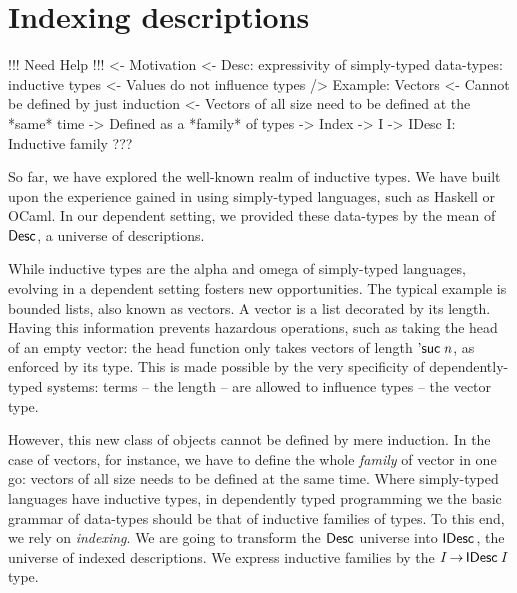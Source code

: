 \section{Indexing descriptions}
\label{sec:indexing-desc}

\begin{wstructure}
!!! Need Help !!!
<- Motivation
    <- Desc: expressivity of simply-typed data-types: inductive types
        <- Values do not influence types
    /> Example: Vectors
        <- Cannot be defined by just induction
            <- Vectors of all size need to be defined at the *same* time
            -> Defined as a *family* of types
                -> Index
        -> I -> IDesc I: Inductive family
    ???
\end{wstructure}


So far, we have explored the well-known realm of inductive types. We
have built upon the experience gained in using simply-typed languages,
such as Haskell or OCaml. In our dependent setting, we provided these
data-types by the mean of $\Desc$, a universe of descriptions. 

While inductive types are the alpha and omega of simply-typed
languages, evolving in a dependent setting fosters new
opportunities. The typical example is bounded lists, also known as
vectors. A vector is a list decorated by its length. Having this
information prevents hazardous operations, such as taking the head of
an empty vector: the head function only takes vectors of length
$\NatSuc{\V{n}}$, as enforced by its type. This is made possible by the
very specificity of dependently-typed systems: terms -- the length --
are allowed to influence types -- the vector type. 

However, this new class of objects cannot be defined by mere
induction. In the case of vectors, for instance, we have to define the
whole \emph{family} of vector in one go: vectors of all size needs to
be defined at the same time. Where simply-typed languages have
inductive types, in dependently typed programming we the basic grammar of
data-types should be that of inductive families of types. To this end, we
rely on \emph{indexing}. We are going to transform the $\Desc$ universe into
$\IDesc{\!}$, the universe of indexed descriptions. We express inductive families
by the $\V{I} \To \IDesc{\V{I}}$ type.   


